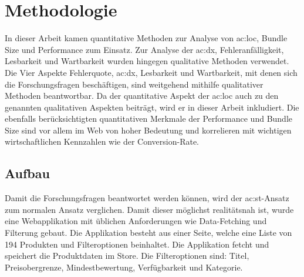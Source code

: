 \chapter{Methodologie}


In dieser Arbeit kamen quantitative Methoden zur Analyse von \acrlong{ac:loc}, Bundle Size und Performance zum Einsatz. Zur Analyse der \acrlong{ac:dx}, Fehleranfälligkeit, Lesbarkeit und Wartbarkeit wurden hingegen qualitative Methoden verwendet. Die Vier Aspekte Fehlerquote, \acrshort{ac:dx}, Lesbarkeit und Wartbarkeit, mit denen sich die Forschungsfragen beschäftigen, sind weitgehend mithilfe qualitativer Methoden beantwortbar. Da der quantitative Aspekt der \acrshort{ac:loc} auch zu den genannten qualitativen Aspekten beiträgt, wird er in dieser Arbeit inkludiert. Die ebenfalls berücksichtigten quantitativen Merkmale der Performance und Bundle Size sind vor allem im Web von hoher Bedeutung und korrelieren mit wichtigen wirtschaftlichen Kennzahlen wie der Conversion-Rate.\cite{googleConversionRateSpeed}


\section{Aufbau}

Damit die Forschungsfragen beantwortet werden können, wird der \acrshort{ac:st}-Ansatz zum normalen Ansatz verglichen. Damit dieser möglichst realitätsnah ist, wurde eine Webapplikation mit üblichen Anforderungen wie Data-Fetching und Filterung gebaut. Die Applikation besteht aus einer Seite, welche eine Liste von 194 Produkten und Filteroptionen beinhaltet. Die Applikation fetcht und speichert die Produktdaten im Store. Die Filteroptionen sind: Titel, Preisobergrenze, Mindestbewertung, Verfügbarkeit und Kategorie.

